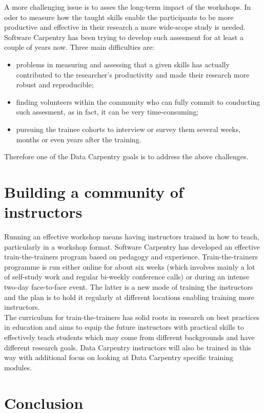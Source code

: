 \documentclass[15]{idcc}
\begin{document}
\begin{itemize}
A more challenging issue is to asses the long-term impact of the workshops. In oder to measure how the taught skills enable the participants to 
be more productive and effective in their research a more wide-scope study is needed. Software Carpentry has been trying to develop such assesment
for at least a couple of years now. Three main difficulties are:
\begin{itemize}
\item problems in measuring and assessing that a given skills has actually contributed to the researcher's productivity and made their research more robust and reproducible;
\item finding volunteers within the community who can fully commit to conducting such assesment, as in fact, it can be very time-consuming;
\item pursuing the trainee cohorts to interview or survey them several weeks, months or even years after the training.
\end{itemize}

Therefore one of the Data Carpentry goals is to address the above challenges. 


\section{Building a community of instructors}
Running an effective workshop means having instructors trained in how to teach, particularly in a workshop format. Software Carpentry has developed
 an effective train-the-trainers program based on pedagogy and experience. Train-the-trainers programme is run either online for about six weeks
 (which involves mainly a lot of self-study work and regular bi-weekly conference calls) or during an intense two-day face-to-face event. The latter 
is a new mode of training the instructors and the plan is to hold it regularly at different locations enabling training more instructors. \\

The curriculum for train-the-trainers has solid roots in research on best practices in education and aims to equip the future instructors with practical
skills to effectively teach students which may come from different backgrounds and have different research goals. Data Carpentry instructors will 
also be trained in this way with additional focus on looking at Data Carpentry specific training modules.  

\section{Conclusion}



\end{itemize}
\end{document}
